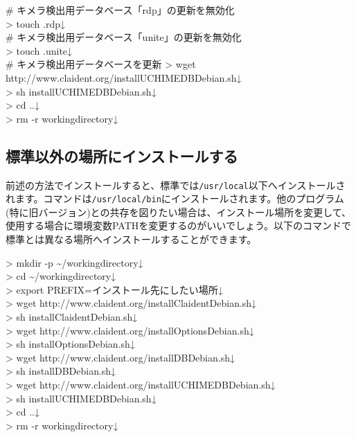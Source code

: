 \documentclass[titlepage,10pt,a4paper]{jsbook}
\newenvironment{cmd}{\begin{oframed}\raggedright\ttfamily\footnotesize\setlength{\baselineskip}{1.4em}}{\end{oframed}\vspace{-1em}}
\begin{document}
\begin{cmd}
\# キメラ検出用データベース「rdp」の更新を無効化\\
{\textgreater} touch .rdp↓\\
\# キメラ検出用データベース「unite」の更新を無効化\\
{\textgreater} touch .unite↓\\
\# キメラ検出用データベースを更新
{\textgreater} wget http://www.claident.org/installUCHIMEDB{\textunderscore}Debian.sh↓\\
{\textgreater} sh installUCHIMEDB{\textunderscore}Debian.sh↓\\
{\textgreater} cd ..↓\\
{\textgreater} rm -r workingdirectory↓
\end{cmd}

\subsection{標準以外の場所にインストールする}

前述の方法でインストールすると、標準では\texttt{/usr/local}以下へインストールされます。コマンドは\texttt{/usr/local/bin}にインストールされます。他のプログラム(特に旧バージョン)との共存を図りたい場合は、インストール場所を変更して、使用する場合に環境変数PATHを変更するのがいいでしょう。以下のコマンドで標準とは異なる場所へインストールすることができます。

\begin{cmd}
{\textgreater} mkdir -p {\textasciitilde}/workingdirectory↓\\
{\textgreater} cd {\textasciitilde}/workingdirectory↓\\
{\textgreater} export PREFIX=インストール先にしたい場所↓\\
{\textgreater} wget http://www.claident.org/installClaident{\textunderscore}Debian.sh↓\\
{\textgreater} sh installClaident{\textunderscore}Debian.sh↓\\
{\textgreater} wget http://www.claident.org/installOptions{\textunderscore}Debian.sh↓\\
{\textgreater} sh installOptions{\textunderscore}Debian.sh↓\\
{\textgreater} wget http://www.claident.org/installDB{\textunderscore}Debian.sh↓\\
{\textgreater} sh installDB{\textunderscore}Debian.sh↓\\
{\textgreater} wget http://www.claident.org/installUCHIMEDB{\textunderscore}Debian.sh↓\\
{\textgreater} sh installUCHIMEDB{\textunderscore}Debian.sh↓\\
{\textgreater} cd ..↓\\
{\textgreater} rm -r workingdirectory↓
\end{cmd}
\end{document}
